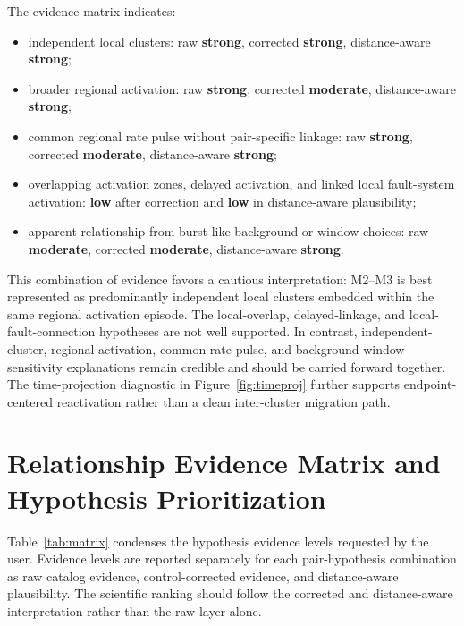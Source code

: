 \documentclass[11pt]{article}
\begin{document}
The evidence matrix indicates:
\begin{itemize}
    \item independent local clusters: raw \textbf{strong}, corrected \textbf{strong}, distance-aware \textbf{strong};
    \item broader regional activation: raw \textbf{strong}, corrected \textbf{moderate}, distance-aware \textbf{strong};
    \item common regional rate pulse without pair-specific linkage: raw \textbf{strong}, corrected \textbf{moderate}, distance-aware \textbf{strong};
    \item overlapping activation zones, delayed activation, and linked local fault-system activation: \textbf{low} after correction and \textbf{low} in distance-aware plausibility;
    \item apparent relationship from burst-like background or window choices: raw \textbf{moderate}, corrected \textbf{moderate}, distance-aware \textbf{strong}.
\end{itemize}

This combination of evidence favors a cautious interpretation: M2--M3 is best represented as predominantly independent local clusters embedded within the same regional activation episode. The local-overlap, delayed-linkage, and local-fault-connection hypotheses are not well supported. In contrast, independent-cluster, regional-activation, common-rate-pulse, and background-window-sensitivity explanations remain credible and should be carried forward together. The time-projection diagnostic in Figure~\ref{fig:timeproj} further supports endpoint-centered reactivation rather than a clean inter-cluster migration path.

\section{Relationship Evidence Matrix and Hypothesis Prioritization}
Table~\ref{tab:matrix} condenses the hypothesis evidence levels requested by the user. Evidence levels are reported separately for each pair-hypothesis combination as raw catalog evidence, control-corrected evidence, and distance-aware plausibility. The scientific ranking should follow the corrected and distance-aware interpretation rather than the raw layer alone.
\end{document}
